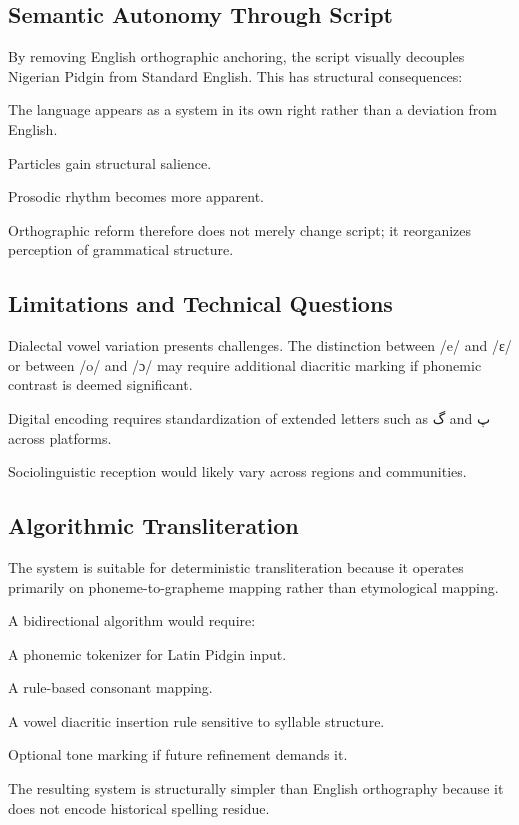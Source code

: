 \documentclass[12pt]{article}
\begin{document}
\subsection{Semantic Autonomy Through Script}

By removing English orthographic anchoring, the script visually decouples Nigerian Pidgin from Standard English. This has structural consequences:

The language appears as a system in its own right rather than a deviation from English.

Particles gain structural salience.

Prosodic rhythm becomes more apparent.

Orthographic reform therefore does not merely change script; it reorganizes perception of grammatical structure.

\subsection{Limitations and Technical Questions}

Dialectal vowel variation presents challenges. The distinction between /e/ and /ɛ/ or between /o/ and /ɔ/ may require additional diacritic marking if phonemic contrast is deemed significant.

Digital encoding requires standardization of extended letters such as گ and پ across platforms.

Sociolinguistic reception would likely vary across regions and communities.

\subsection{Algorithmic Transliteration}

The system is suitable for deterministic transliteration because it operates primarily on phoneme-to-grapheme mapping rather than etymological mapping.

A bidirectional algorithm would require:

A phonemic tokenizer for Latin Pidgin input.

A rule-based consonant mapping.

A vowel diacritic insertion rule sensitive to syllable structure.

Optional tone marking if future refinement demands it.

The resulting system is structurally simpler than English orthography because it does not encode historical spelling residue.
\end{document}
